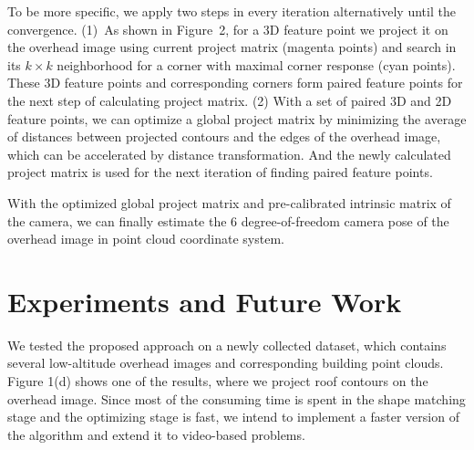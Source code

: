To be more specific, we apply two steps in every iteration alternatively until the convergence. (1)~As shown in Figure~2, for a 3D feature point we project it on the overhead image using current project matrix (magenta points) and search in its $k\times k$ neighborhood for a corner with maximal corner response (cyan points). These 3D feature points and corresponding corners form paired feature points for the next step of calculating project matrix.
(2) With a set of paired 3D and 2D feature points, we can optimize a global project matrix by minimizing the average of distances between projected contours and the edges of the overhead image, which can be accelerated by distance transformation. And the newly calculated project matrix is used for the next iteration of finding paired feature points.

With the optimized global project matrix and pre-calibrated intrinsic matrix of the camera, we can finally estimate the 6 degree-of-freedom camera pose of the overhead image in point cloud coordinate system.
\section{Experiments and Future Work}
We tested the proposed approach on a newly collected dataset, which contains several low-altitude overhead images and corresponding building point clouds. Figure 1(d) shows one of the results, where we project roof contours on the overhead image. Since most of the consuming time is spent in the shape matching stage and the optimizing stage is fast, we intend to implement a faster version of the algorithm and extend it to video-based problems. 
